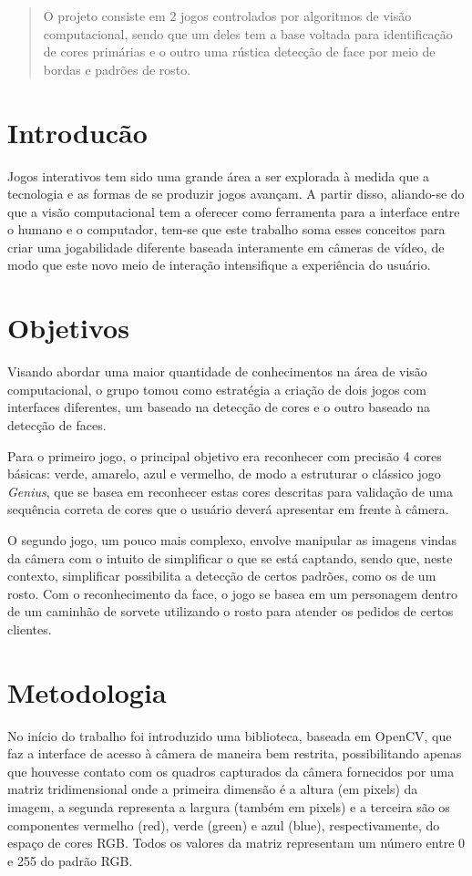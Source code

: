 \documentclass{sciposter}
\begin{document}
\begin{multicols}{3}

\begin{abstract}
O projeto consiste em 2 jogos controlados por algoritmos de visão computacional, sendo que um deles tem a base voltada para identificação de cores primárias e o outro uma rústica detecção de face por meio de bordas e padrões de rosto.
\end{abstract}

\section{Introducão}
Jogos interativos tem sido uma grande área a ser explorada à medida que a tecnologia e as formas de se produzir jogos avançam. A partir disso, aliando-se do que a visão computacional tem a oferecer como ferramenta para a interface entre o humano e o computador, tem-se que este trabalho soma esses conceitos para criar uma jogabilidade diferente baseada interamente em câmeras de vídeo, de modo que este novo meio de interação intensifique a experiência do usuário.

\newcommand{\imsize}{0.45\columnwidth}


\section{Objetivos}
Visando abordar uma maior quantidade de conhecimentos na área de visão computacional, o grupo tomou como estratégia a criação de dois jogos com interfaces diferentes, um baseado na detecção de cores e o outro baseado na detecção de faces.

Para o primeiro jogo, o principal objetivo era reconhecer com precisão 4 cores básicas: verde, amarelo, azul e vermelho, de modo a estruturar o clássico jogo \textit{Genius}, que se basea em reconhecer estas cores descritas para validação de uma sequência correta de cores que o usuário deverá apresentar em frente à câmera.

O segundo jogo, um pouco mais complexo, envolve manipular as imagens vindas da câmera com o intuito de simplificar o que se está captando, sendo que, neste contexto, simplificar possibilita a detecção de certos padrões, como os de um rosto. Com o reconhecimento da face, o jogo se basea em um personagem dentro de um caminhão de sorvete utilizando o rosto para atender os pedidos de certos clientes.

\section{Metodologia}
No início do trabalho foi introduzido uma biblioteca, baseada em OpenCV, que faz a interface de acesso à câmera de maneira bem restrita, possibilitando apenas que houvesse contato com os quadros capturados da câmera fornecidos por uma matriz tridimensional onde a primeira dimensão é a altura (em pixels) da imagem, a segunda representa a largura (também em pixels) e a terceira são os componentes vermelho (red), verde (green) e azul (blue), respectivamente, do espaço de cores RGB. Todos os valores da matriz representam um número entre 0 e 255 do padrão RGB.


\end{multicols}
\end{document}
